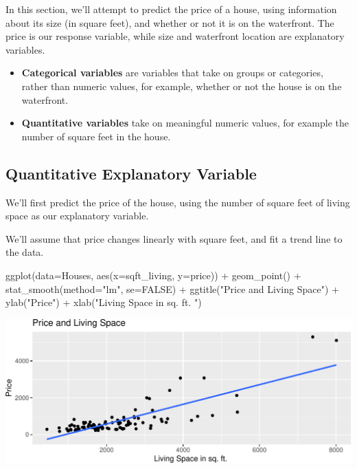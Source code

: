\documentclass[
  letterpaper,
  DIV=11,
  numbers=noendperiod]{scrreprt}
\newenvironment{Shaded}{\begin{snugshade}}{\end{snugshade}}
\newcommand{\AttributeTok}[1]{\textcolor[rgb]{0.40,0.45,0.13}{#1}}
\newcommand{\ConstantTok}[1]{\textcolor[rgb]{0.56,0.35,0.01}{#1}}
\newcommand{\FunctionTok}[1]{\textcolor[rgb]{0.28,0.35,0.67}{#1}}
\newcommand{\NormalTok}[1]{\textcolor[rgb]{0.00,0.23,0.31}{#1}}
\newcommand{\SpecialCharTok}[1]{\textcolor[rgb]{0.37,0.37,0.37}{#1}}
\newcommand{\StringTok}[1]{\textcolor[rgb]{0.13,0.47,0.30}{#1}}
\begin{document}
In this section, we'll attempt to predict the price of a house, using
information about its size (in square feet), and whether or not it is on
the waterfront. The price is our response variable, while size and
waterfront location are explanatory variables.

\begin{itemize}
\item
  \textbf{Categorical variables} are variables that take on groups or
  categories, rather than numeric values, for example, whether or not
  the house is on the waterfront.
\item
  \textbf{Quantitative variables} take on meaningful numeric values, for
  example the number of square feet in the house.
\end{itemize}

\subsection{Quantitative Explanatory
Variable}\label{quantitative-explanatory-variable}

We'll first predict the price of the house, using the number of square
feet of living space as our explanatory variable.

We'll assume that price changes linearly with square feet, and fit a
trend line to the data.

\begin{Shaded}
\begin{Highlighting}[]
\FunctionTok{ggplot}\NormalTok{(}\AttributeTok{data=}\NormalTok{Houses, }\FunctionTok{aes}\NormalTok{(}\AttributeTok{x=}\NormalTok{sqft\_living, }\AttributeTok{y=}\NormalTok{price)) }\SpecialCharTok{+}
  \FunctionTok{geom\_point}\NormalTok{() }\SpecialCharTok{+}
  \FunctionTok{stat\_smooth}\NormalTok{(}\AttributeTok{method=}\StringTok{"lm"}\NormalTok{, }\AttributeTok{se=}\ConstantTok{FALSE}\NormalTok{) }\SpecialCharTok{+}
  \FunctionTok{ggtitle}\NormalTok{(}\StringTok{"Price and Living Space"}\NormalTok{) }\SpecialCharTok{+} 
  \FunctionTok{ylab}\NormalTok{(}\StringTok{"Price"}\NormalTok{) }\SpecialCharTok{+} 
  \FunctionTok{xlab}\NormalTok{(}\StringTok{"Living Space in sq. ft. "}\NormalTok{)}
\end{Highlighting}
\end{Shaded}

\includegraphics{Ch2_files/figure-pdf/unnamed-chunk-3-1.pdf}
\end{document}
